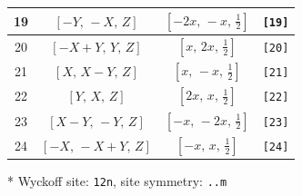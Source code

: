 \documentclass[fleqn,8pt]{jsarticle}
\begin{document}
\begin{longtable}{cccc}
19 & $\left[ - Y,\, - X,\, Z \right]$ & $\left[ - 2 x,\, - x,\, \frac{1}{2} \right]$ & {\tt [19]} \\ \hline
20 & $\left[ - X + Y,\, Y,\, Z \right]$ & $\left[ x,\, 2 x,\, \frac{1}{2} \right]$ & {\tt [20]} \\ \hline
21 & $\left[ X,\, X - Y,\, Z \right]$ & $\left[ x,\, - x,\, \frac{1}{2} \right]$ & {\tt [21]} \\ \hline
22 & $\left[ Y,\, X,\, Z \right]$ & $\left[ 2 x,\, x,\, \frac{1}{2} \right]$ & {\tt [22]} \\ \hline
23 & $\left[ X - Y,\, - Y,\, Z \right]$ & $\left[ - x,\, - 2 x,\, \frac{1}{2} \right]$ & {\tt [23]} \\ \hline
24 & $\left[ - X,\, - X + Y,\, Z \right]$ & $\left[ - x,\, x,\, \frac{1}{2} \right]$ & {\tt [24]} \\
\end{longtable}
* Wyckoff site: {\tt 12n}, site symmetry: {\tt ..m}
\renewcommand{\arraystretch}{1.2}
\end{document}
